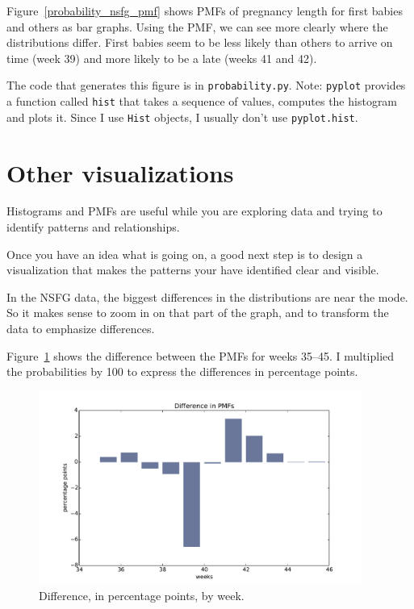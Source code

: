 \documentclass[12pt]{book}
\begin{document}
Figure~\ref{probability_nsfg_pmf} shows PMFs of pregnancy length for first babies
and others as bar graphs.  Using the PMF, we can see more clearly
where the distributions differ.  First babies seem to be less likely
than others to arrive on time (week 39) and more likely to be a late
(weeks 41 and 42).

The code that generates this figure is in {\tt probability.py}.
Note: {\tt pyplot} provides a function called {\tt hist} that
takes a sequence of values, computes the histogram and plots it.
Since I use {\tt Hist} objects, I usually don't use {\tt pyplot.hist}.



\section{Other visualizations}

Histograms and PMFs are useful while you are exploring data and
trying to identify patterns and relationships.

Once you have an idea what is going on, a good next step is to
design a visualization that makes the patterns your have identified
clear and visible.

In the NSFG data, the biggest differences in the distributions are
near the mode.  So it makes sense to zoom in on that part of the
graph, and to transform the data to emphasize differences.

Figure~\ref{probability_nsfg_diffs} shows the difference between the PMFs for
weeks 35--45.  I multiplied the probabilities by 100 to express the
differences in percentage points.

\begin{figure}
\centerline{\includegraphics[height=2.5in]{figs/probability_nsfg_diffs.pdf}}
\caption{Difference, in percentage points, by week.}
\label{probability_nsfg_diffs}
\end{figure}
\end{document}
